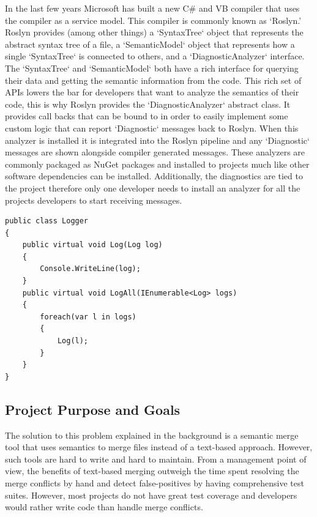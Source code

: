 \documentclass[10pt,draftclsnofoot,onecolumn]{IEEEtran}
\begin{document}
In the last few years Microsoft has built a new C\# and VB compiler that uses the compiler as a service model. This compiler is commonly known as ‘Roslyn.’ Roslyn provides (among other things) a `SyntaxTree` object that represents the abstract syntax tree of a file, a `SemanticModel` object that represents how a single `SyntaxTree` is connected to others, and a `DiagnosticAnalyzer` interface. The `SyntaxTree` and `SemanticModel` both have a rich interface for querying their data and getting the semantic information from the code. This rich set of APIs lowers the bar for developers that want to analyze the semantics of their code, this is why Roslyn provides the `DiagnosticAnalyzer` abstract class. It provides call backs that can be bound to in order to easily implement some custom logic that can report `Diagnostic` messages back to Roslyn. When this analyzer is installed it is integrated into the Roslyn pipeline and any `Diagnostic` messages are shown alongside compiler generated messages. These analyzers are commonly packaged as NuGet packages and installed to projects much like other software dependencies can be installed. Additionally, the diagnostics are tied to the project therefore only one developer needs to install an analyzer for all the projects developers to start receiving messages.

\begingroup
\begin{lstlisting}
public class Logger
{
	public virtual void Log(Log log)
	{
		Console.WriteLine(log);
	}
	public virtual void LogAll(IEnumerable<Log> logs)
	{
		foreach(var l in logs)
		{
			Log(l);
		}
	}
}
\end{lstlisting}
\endgroup

\subsection{Project Purpose and Goals}
The solution to this problem explained in the background is a semantic merge tool that uses semantics to merge files instead of a text-based approach. However, such tools are hard to write and hard to maintain. From a management point of view, the benefits of text-based merging outweigh the time spent resolving the merge conflicts by hand and detect false-positives by having comprehensive test suites. However, most projects do not have great test coverage and developers would rather write code than handle merge conflicts.
\end{document}
